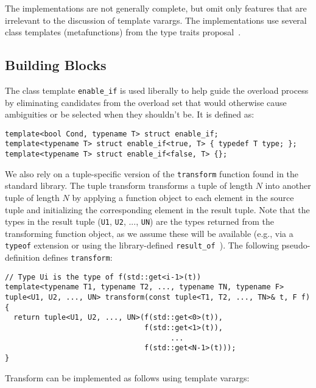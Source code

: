 \documentclass{article}
\begin{document}
The implementations are not generally complete, but omit only features
that are irrelevant to the discussion of template varargs. The
implementations use several class templates (metafunctions) from the
type traits proposal~\cite{Maddock03}.

\subsection{Building Blocks}
\label{building_blocks}
The class template {\tt enable\_if} is used liberally to help guide
the overload process by eliminating candidates from the overload set
that would otherwise cause ambiguities or be selected when they
shouldn't be. It is defined as:

\begin{verbatim}
template<bool Cond, typename T> struct enable_if;
template<typename T> struct enable_if<true, T> { typedef T type; };
template<typename T> struct enable_if<false, T> {};
\end{verbatim}

We also rely on a tuple-specific version of the {\tt transform}
function found in the standard library. The tuple transform transforms
a tuple of length $N$ into another tuple of length $N$ by applying a
function object to each element in the source tuple and initializing
the corresponding element in the result tuple. Note that the types in
the result tuple ({\tt U1}, {\tt U2}, ..., {\tt UN}) are the types
returned from the transforming function object, as we assume these
will be available (e.g., via a {\tt typeof} extension or using the
library-defined {\tt result\_of}~\cite{Gregor03}). The following
pseudo-definition defines {\tt transform}:
\begin{verbatim}
// Type Ui is the type of f(std::get<i-1>(t))
template<typename T1, typename T2, ..., typename TN, typename F>
tuple<U1, U2, ..., UN> transform(const tuple<T1, T2, ..., TN>& t, F f)
{ 
  return tuple<U1, U2, ..., UN>(f(std::get<0>(t)), 
                                f(std::get<1>(t)),
                                      ...
                                f(std::get<N-1>(t)));
}
\end{verbatim}

Transform can be implemented as follows using template varargs:
\end{document}
